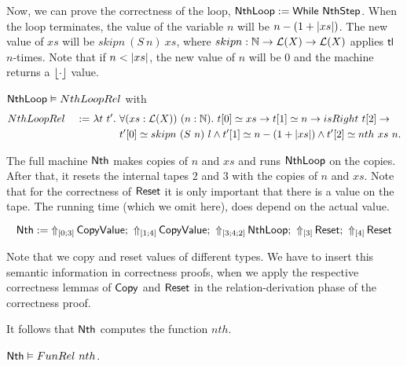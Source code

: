Now, we can prove the correctness of the loop, $\MS{NthLoop} := \While~\MS{NthStep}$.  When the loop terminates, the value of the variable $n$ will be
$n - (1 + \length{xs})$.  The new value of $xs$ will be $skipn~(S~n)~xs$, where $skipn : \Nat \to \List(X) \to \List(X)$ applies $\tl$ $n$-times.  Note
that if $n < \length{xs}$, the new value of $n$ will be $0$ and the machine returns a $\Some\cdot$ value.

\begin{lemma}
  \label{lem:Nth_Loop_Realise}
  $\MS{NthLoop} \Realise NthLoopRel$ with
  \begin{alignat*}{2}
    & NthLoopRel &~:=~& \lambda t~t'.~\forall (xs:\List(X))~(n:\Nat).~t[0] \simeq xs \rightarrow t[1] \simeq n \rightarrow isRight~t[2] \rightarrow \\
    &            &~  ~& \phantom{\lambda t~t'.}~t'[0] \simeq skipn~(S~n)~l \land t'[1] \simeq n-(1+\length{xs}) \land t'[2] \simeq nth~xs~n.
  \end{alignat*}
\end{lemma}

The full machine $\MS{Nth}$ makes copies of $n$ and $xs$ and runs $\MS{NthLoop}$ on the copies.  After that, it resets the internal tapes $2$ and $3$
with the copies of $n$ and $xs$.  Note that for the correctness of $\MS{Reset}$ it is only important that there is a value on the tape.  The running time
(which we omit here), does depend on the actual value.
\begin{definition}[$\MS{Nth}$][Nth]
  \[
    \MS{Nth} := \LiftTapes{\MS{CopyValue}}{\Vector{0;3}} \Seq
    \LiftTapes{\MS{CopyValue}}{\Vector{1;4}} \Seq
    \LiftTapes{\MS{NthLoop}}{\Vector{3;4;2}} \Seq
    \LiftTapes{\MS{Reset}}{\Vector{3}} \Seq
    \LiftTapes{\MS{Reset}}{\Vector{4}}
  \]
\end{definition}
Note that we copy and reset values of different types.  We have to insert this semantic information in correctness proofs, when we apply the
respective correctness lemmas of $\MS{Copy}$ and $\MS{Reset}$ in the relation-derivation phase of the correctness proof.

It follows that $\MS{Nth}$ computes the function $nth$.
\begin{lemma}
  \label{lem:Nth_Computes}
  $\MS{Nth} \Realise FunRel~nth$.
\end{lemma}



